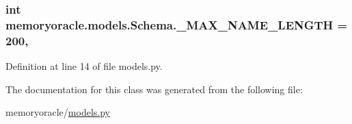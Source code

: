 \subsubsection[{\+\_\+\+M\+A\+X\+\_\+\+N\+A\+M\+E\+\_\+\+L\+E\+N\+G\+T\+H}]{\setlength{\rightskip}{0pt plus 5cm}int memoryoracle.\+models.\+Schema.\+\_\+\+M\+A\+X\+\_\+\+N\+A\+M\+E\+\_\+\+L\+E\+N\+G\+T\+H = 200\hspace{0.3cm}{\ttfamily [static]}, {\ttfamily [private]}}\label{classmemoryoracle_1_1models_1_1Schema_a07bc973f22599224844d9316c86f50d5}


Definition at line 14 of file models.\+py.



The documentation for this class was generated from the following file\+:\begin{DoxyCompactItemize}
\item 
memoryoracle/\hyperlink{models_8py}{models.\+py}\end{DoxyCompactItemize}
